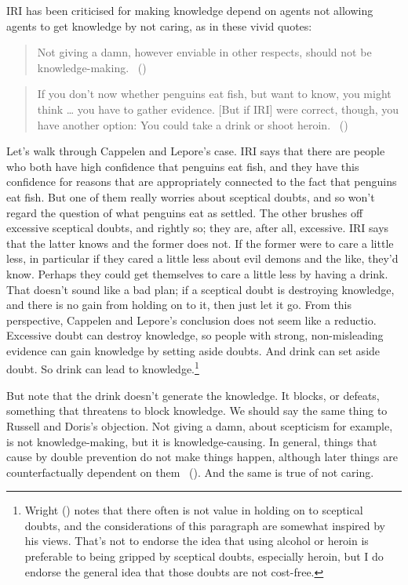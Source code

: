 \documentclass[
  10pt,
  letterpaper,
  DIV=11,
  numbers=noendperiod,
  twoside]{scrartcl}
\begin{document}
IRI has been criticised for making knowledge depend on agents not
allowing agents to get knowledge by not caring, as in these vivid
quotes:

\begin{quote}
Not giving a damn, however enviable in other respects, should not be
knowledge-making. ~()
\end{quote}

\begin{quote}
If you don't now whether penguins eat fish, but want to know, you might
think \ldots{} you have to gather evidence. {[}But if IRI{]} were
correct, though, you have another option: You could take a drink or
shoot heroin. ~()
\end{quote}

Let's walk through Cappelen and Lepore's case. IRI says that there are
people who both have high confidence that penguins eat fish, and they
have this confidence for reasons that are appropriately connected to the
fact that penguins eat fish. But one of them really worries about
sceptical doubts, and so won't regard the question of what penguins eat
as settled. The other brushes off excessive sceptical doubts, and
rightly so; they are, after all, excessive. IRI says that the latter
knows and the former does not. If the former were to care a little less,
in particular if they cared a little less about evil demons and the
like, they'd know. Perhaps they could get themselves to care a little
less by having a drink. That doesn't sound like a bad plan; if a
sceptical doubt is destroying knowledge, and there is no gain from
holding on to it, then just let it go. From this perspective, Cappelen
and Lepore's conclusion does not seem like a reductio. Excessive doubt
can destroy knowledge, so people with strong, non-misleading evidence
can gain knowledge by setting aside doubts. And drink can set aside
doubt. So drink can lead to knowledge.\footnote{Wright
  () notes that there often is not value
  in holding on to sceptical doubts, and the considerations of this
  paragraph are somewhat inspired by his views. That's not to endorse
  the idea that using alcohol or heroin is preferable to being gripped
  by sceptical doubts, especially heroin, but I do endorse the general
  idea that those doubts are not cost-free.}

But note that the drink doesn't generate the knowledge. It blocks, or
defeats, something that threatens to block knowledge. We should say the
same thing to Russell and Doris's objection. Not giving a damn, about
scepticism for example, is not knowledge-making, but it is
knowledge-causing. In general, things that cause by double prevention do
not make things happen, although later things are counterfactually
dependent on them ~(). And the same
is true of not caring.
\end{document}
